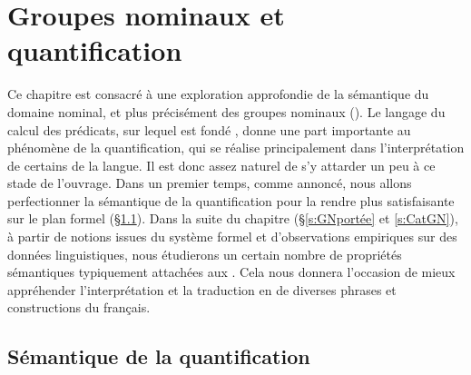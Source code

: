 \chapter{Groupes nominaux et quantification}
\label{ch:gn}



Ce chapitre est consacré à une exploration approfondie de la sémantique du domaine nominal, et plus précisément des groupes nominaux (\GN). Le langage du calcul des prédicats, sur lequel est fondé {\LO}, donne une part importante au phénomène de la quantification, qui se réalise principalement dans l'interprétation de certains {\GN} de la langue.  Il est donc assez naturel de s'y attarder un peu à ce stade de l'ouvrage. Dans un premier temps, comme annoncé, nous allons perfectionner la sémantique de la quantification pour la rendre plus satisfaisante sur le plan formel (\S\ref{s:quantif2}). 
Dans la suite du chapitre (\S\ref{s:GNportée} et \ref{s:CatGN}), à partir de notions issues du système formel et d'observations empiriques sur des données linguistiques, nous étudierons un certain nombre de propriétés sémantiques typiquement attachées aux {\GN}. Cela nous donnera l'occasion de mieux appréhender l'interprétation et la traduction en {\LO} de diverses phrases et constructions du français.


\section{Sémantique de la quantification}
\label{s:quantif2}

